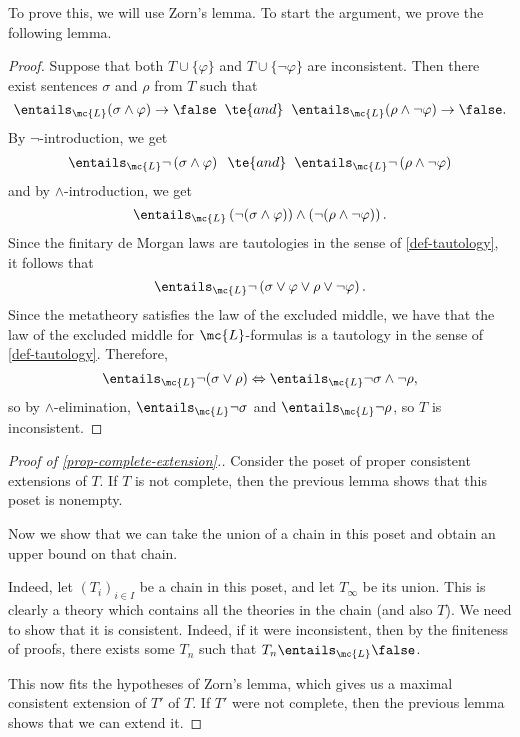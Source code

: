 \documentclass[11pt]{article}
\begin{document}

    To prove this, we will use Zorn's lemma. To start the argument, we prove the following lemma.


\begin{proof}
  Suppose that both $T \cup \{\varphi\}$ and $T \cup \{ \neg \varphi\}$ are inconsistent. Then there exist sentences $\sigma$ and $\rho$ from $T$ such that
  $$
\entails_{\mc{L}} (\sigma \wedge \varphi) \to \false \hspace{2mm} \te{ and } \hspace{2mm} \entails_{\mc{L}} (\rho \wedge \neg \varphi) \to \false.
$$
By $\neg$-introduction, we get
$$
\entails_{\mc{L}} \neg \left(\sigma \wedge \varphi\right) \hspace{2mm} \te{ and } \hspace{2mm} \entails_{\mc{L}} \neg \left(\rho \wedge \neg \varphi\right)
$$
and by $\wedge$-introduction, we get
$$
\entails_{\mc{L}} \left(\neg(\sigma \wedge \varphi) \right) \wedge \left(\neg (\rho \wedge \neg \varphi) \right).
$$
Since the finitary de Morgan laws are tautologies in the sense of \ref{def-tautology}, it follows that
$$
\entails_{\mc{L}} \neg \left(\sigma \lor \varphi \lor \rho \lor \neg \varphi\right).
$$
Since the metatheory satisfies the law of the excluded middle, we have that the law of the excluded middle for $\mc{L}$-formulas is a tautology in the sense of \ref{def-tautology}. Therefore,
$$
\entails_{\mc{L}} \neg(\sigma \lor \rho) \Leftrightarrow \entails_{\mc{L}} \neg \sigma \land \neg \rho,
$$
so by $\wedge$-elimination,
$\entails_{\mc{L}} \neg \sigma$ and $\entails_{\mc{L}} \neg \rho$, so $T$ is inconsistent.
\end{proof}


    \begin{proof}[Proof of \ref{prop-complete-extension}.]
      Consider the poset of proper consistent extensions of $T$. If $T$ is not complete, then the previous lemma shows that this poset is nonempty.

      Now we show that we can take the union of a chain in this poset and obtain an upper bound on that chain.

      Indeed, let $(T_i)_{i \in I}$ be a chain in this poset, and let $T_{\infty}$ be its union. This is clearly a theory which contains all the theories in the chain (and also $T$). We need to show that it is consistent. Indeed, if it were inconsistent, then by the finiteness of proofs, there exists some $T_n$ such that $T_n \entails_{\mc{L}} \false$.

      This now fits the hypotheses of Zorn's lemma, which gives us a maximal consistent extension of $T'$ of $T$. If $T'$ were not complete, then the previous lemma shows that we can extend it.
    \end{proof}
\end{document}
